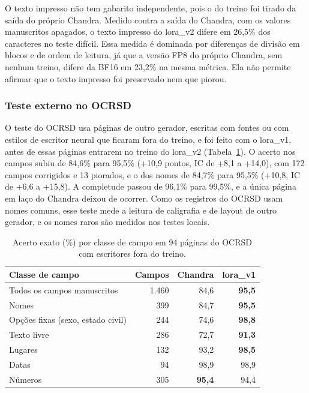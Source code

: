 \documentclass[12pt,a4paper]{article}
\begin{document}
O texto impresso não tem gabarito independente, pois o do treino foi tirado da saída do próprio Chandra. Medido contra a saída do Chandra, com os valores manuscritos apagados, o texto impresso do lora\_v2 difere em 26,5\% dos caracteres no teste difícil. Essa medida é dominada por diferenças de divisão em blocos e de ordem de leitura, já que a versão FP8 do próprio Chandra, sem nenhum treino, difere da BF16 em 23,2\% na mesma métrica. Ela não permite afirmar que o texto impresso foi preservado nem que piorou.

\subsubsection{Teste externo no OCRSD}
O teste do OCRSD usa páginas de outro gerador, escritas com fontes ou com estilos de escritor neural que ficaram fora do treino, e foi feito com o lora\_v1, antes de essas páginas entrarem no treino do lora\_v2 (Tabela~\ref{tab:ocrsd}). O acerto nos campos subiu de 84,6\% para 95,5\% (+10,9 pontos, IC de +8,1 a +14,0), com 172 campos corrigidos e 13 piorados, e o dos nomes de 84,7\% para 95,5\% (+10,8, IC de +6,6 a +15,8). A completude passou de 96,1\% para 99,5\%, e a única página em laço do Chandra deixou de ocorrer. Como os registros do OCRSD usam nomes comuns, esse teste mede a leitura de caligrafia e de layout de outro gerador, e os nomes raros são medidos nos testes locais.

\begin{table}[H]
\centering
\small
\begin{tabular}{@{}lrrr@{}}
\toprule
Classe de campo & Campos & Chandra & lora\_v1 \\
\midrule
Todos os campos manuscritos & 1.460 & 84,6 & \textbf{95,5} \\
Nomes & 399 & 84,7 & \textbf{95,5} \\
Opções fixas (sexo, estado civil) & 244 & 74,6 & \textbf{98,8} \\
Texto livre & 286 & 72,7 & \textbf{91,3} \\
Lugares & 132 & 93,2 & \textbf{98,5} \\
Datas & 94 & 98,9 & 98,9 \\
Números & 305 & \textbf{95,4} & 94,4 \\
\bottomrule
\end{tabular}
\caption{Acerto exato (\%) por classe de campo em 94 páginas do OCRSD com escritores fora do treino.}
\label{tab:ocrsd}
\end{table}
\end{document}
